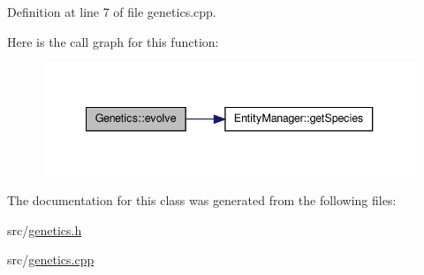 Definition at line 7 of file genetics.\-cpp.



Here is the call graph for this function\-:\nopagebreak
\begin{figure}[H]
\begin{center}
\leavevmode
\includegraphics[width=340pt]{class_genetics_a63e33bd3725feb511e19d86e2d07ca3b_cgraph}
\end{center}
\end{figure}




The documentation for this class was generated from the following files\-:\begin{DoxyCompactItemize}
\item 
src/\hyperlink{genetics_8h}{genetics.\-h}\item 
src/\hyperlink{genetics_8cpp}{genetics.\-cpp}\end{DoxyCompactItemize}
